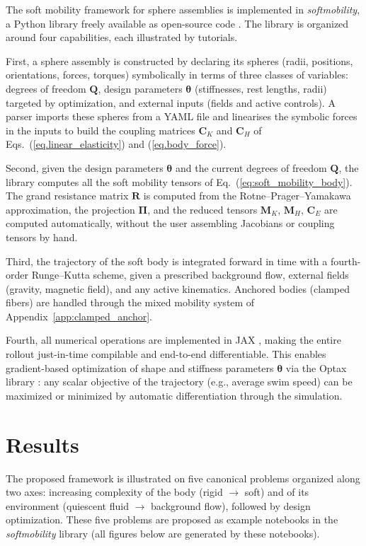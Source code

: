 \documentclass[aps,prfluids,groupedaddress]{revtex4-2}
\newcommand{\btheta}{\bm{\theta}}
\newcommand{\bQ}{\bm{Q}}
\newcommand{\tC}{\bm{{C}}}
\newcommand{\tM}{\bm{{M}}}
\newcommand{\tPi}{\bm{{\Pi}}}
\newcommand{\tR}{\bm{{R}}}
\begin{document}
The soft mobility framework for sphere assemblies is implemented in \emph{softmobility}, a Python library freely available as open-source code \cite{softmobility}. The library is organized around four capabilities, each illustrated by tutorials.

First, a sphere assembly is constructed by declaring its spheres (radii, positions, orientations, forces, torques) symbolically in terms of three classes of variables: degrees of freedom $\bQ$, design parameters $\btheta$ (stiffnesses, rest lengths, radii) targeted by optimization, and external inputs (fields and active controls). A parser imports these spheres from a YAML file and linearises the symbolic forces in the inputs to build the coupling matrices $\tC_K$ and $\tC_H$ of Eqs.~(\ref{eq.linear_elasticity}) and (\ref{eq.body_force}).

Second, given the design parameters $\btheta$ and the current degrees of freedom $\bQ$, the library computes all the soft mobility tensors of Eq.~(\ref{eq:soft_mobility_body}). The grand resistance matrix $\tR$ is computed from the Rotne--Prager--Yamakawa approximation, the projection $\tPi$, and the reduced tensors $\tM_K$, $\tM_H$, $\tC_E$ are computed automatically, without the user assembling Jacobians or coupling tensors by hand.

Third, the trajectory of the soft body is integrated forward in time with a fourth-order Runge--Kutta scheme, given a prescribed background flow, external fields (gravity, magnetic field), and any active kinematics. Anchored bodies (clamped fibers) are handled through the mixed mobility system of Appendix~\ref{app:clamped_anchor}.

Fourth, all numerical operations are implemented in JAX \cite{jax2018github}, making the entire rollout just-in-time compilable and end-to-end differentiable. This enables gradient-based optimization of shape and stiffness parameters $\btheta$ via the Optax library \cite{optax2020github}: any scalar objective of the trajectory (e.g., average swim speed) can be maximized or minimized by automatic differentiation through the simulation.


\section{Results\label{sec.results}}

The proposed framework is illustrated on five canonical problems organized along two axes: increasing complexity of the body (rigid $\to$ soft) and of its environment (quiescent fluid $\to$ background flow), followed by design optimization. 
These five problems are proposed as example notebooks in the \emph{softmobility} library \cite{softmobility} (all figures below are generated by these notebooks).  
\end{document}
